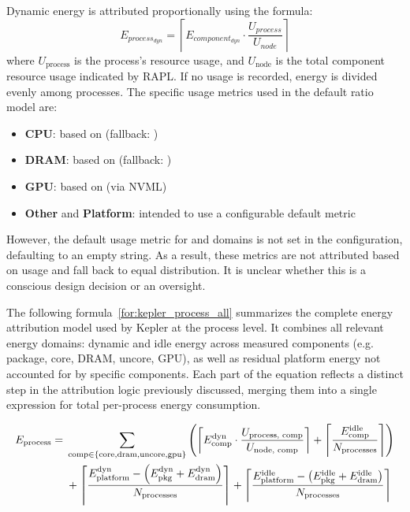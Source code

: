 Dynamic energy is attributed proportionally using the formula:
\begin{equation}
E_{process_{dyn}} = \left\lceil E_{component_{dyn}} \cdot \frac{U_{process}}{U_{node}} \right\rceil
\end{equation}
where $U_{\text{process}}$ is the process's resource usage, and $U_{\text{node}}$ is the total component resource usage indicated by RAPL. If no usage is recorded, energy is divided evenly among processes. The specific usage metrics used in the default ratio model are:
\begin{itemize}
  \item \textbf{CPU}: based on  (fallback: )
  \item \textbf{DRAM}: based on  (fallback: )
  \item \textbf{GPU}: based on  (via NVML)
  \item \textbf{Other} and \textbf{Platform}: intended to use a configurable default metric
\end{itemize}
However, the default usage metric for  and  domains is not set in the configuration, defaulting to an empty string. As a result, these metrics are not attributed based on usage and fall back to equal distribution. It is unclear whether this is a conscious design decision or an oversight.

The following formula~\ref{for:kepler_process_all} summarizes the complete energy attribution model used by Kepler at the process level. It combines all relevant energy domains: dynamic and idle energy across measured components (e.g. package, core, DRAM, uncore, GPU), as well as residual platform energy not accounted for by specific components. Each part of the equation reflects a distinct step in the attribution logic previously discussed, merging them into a single expression for total per-process energy consumption.

\begin{align}
    \label{for:kepler_process_all}
    E_{\text{process}} = \; &
    \sum_{\text{comp} \in \{\text{core}, \text{dram}, \text{uncore}, \text{gpu}\}} 
    \left(
    \left\lceil 
    E_{\text{comp}}^{\text{dyn}} \cdot \frac{U_{\text{process, comp}}}{U_{\text{node, comp}}} 
    \right\rceil
    + 
    \left\lceil 
    \frac{E_{\text{comp}}^{\text{idle}}}{N_{\text{processes}}} 
    \right\rceil
    \right) \notag \\
    & + 
    \left\lceil 
    \frac{E_{\text{platform}}^{\text{dyn}}  - \left(E_{\text{pkg}}^{\text{dyn}}  + E_{\text{dram}}^{\text{dyn}} \right)}{N_{\text{processes}}} 
    \right\rceil
    + 
    \left\lceil 
    \frac{E_{\text{platform}}^{\text{idle}}  - \left(E_{\text{pkg}}^{\text{idle}}  + E_{\text{dram}}^{\text{idle}} \right)}{N_{\text{processes}}} 
    \right\rceil
\end{align}

